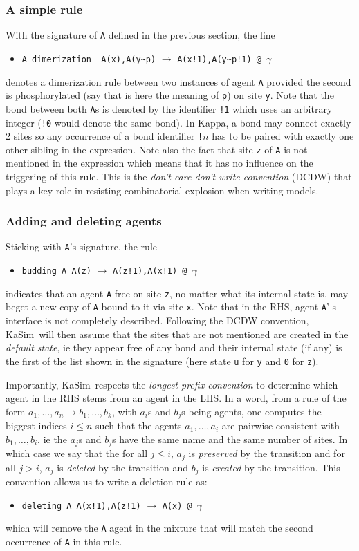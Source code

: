 \documentclass[11pt]{book}
\def\KaSim{\textsf{KaSim}}
\def\int{\hbox{\texttt{\~}}}
\def\ttt#1{\texttt{#1}}
\def\var#1{\textquotesingle #1\textquotesingle}
\def\rar{\rightarrow}
\def\ga{\gamma}
\def\ie{ie }
\def\via{via }
\def\ITE#1{\begin{itemize}#1\end{itemize}}
\begin{document}
\subsubsection*{A simple rule}
With the signature of \ttt{A} defined in the previous section, the line
\ITE{
\item[] \ttt{\textquotesingle A dimerization\textquotesingle~  A(x),A(y\int p)} $\rar$ \ttt{A(x!1),A(y\int p!1) @ $\ga$} 
}
denotes a dimerization rule between two instances of agent \ttt{A} provided the second is phosphorylated (say that is here the meaning of \ttt{p}) on site \ttt{y}. Note that the bond between both \ttt{A}s is denoted by the identifier \ttt{!1} which uses an arbitrary integer (\ttt{!0} would denote the same bond). In Kappa, a bond may connect exactly 2 sites so any occurrence of a bond identifier \ttt{!}$n$ has to be paired with exactly one other sibling in the expression. Note also the fact that site \ttt{z} of \ttt{A} is not mentioned in the expression which means that it has no influence on the triggering of this rule. This is the \emph{don't care don't write convention} (DCDW)  that plays a key role in resisting combinatorial explosion when writing models.

\subsubsection*{Adding and deleting agents}
Sticking with \ttt{A}'s signature, the rule
\ITE{
\item[] \ttt{\var{budding A}~A(z)} $\rar$ \ttt{A(z!1),A(x!1) @ $\ga$ } 
}
indicates that an agent \ttt{A} free on site \ttt{z}, no matter what its internal state is, may beget a new copy of \ttt{A} bound to it \via site \ttt{x}. Note that in the RHS, agent \ttt{A}' s interface is not completely described. Following the DCDW convention, \KaSim~will then assume that the sites that are not mentioned are created in the \emph{default state}, \ie they appear free of any bond and their internal state (if any) is the first of the list shown in the signature (here state \ttt{u} for \ttt{y} and \ttt{0} for \ttt{z}).

Importantly, \KaSim~respects the \emph{longest prefix convention} to determine which agent in the RHS stems from an agent in the LHS. 
In a word, from a rule of the form $a_1,\dots,a_n\rar b_1,\dots,b_k$, with $a_i$s and $b_j$s being agents, one computes the biggest indices $i\leq n$ such that the agents $a_1,\dots,a_i$ are pairwise consistent with $b_1,\dots,b_i$, \ie the $a_j$s and $b_j$s have the same name and the same number of sites. In which case we say that the for all $j\leq i$, $a_j$ is \emph{preserved} by the transition and for all $j>i$, $a_j$ is \emph{deleted} by the transition and $b_j$ is \emph{created} by the transition. This convention allows us to write a deletion rule as:
\ITE{
\item[] \ttt{\textquotesingle deleting A\textquotesingle\  A(x!1),A(z!1)} $\rar$ \ttt{A(x) @ $\ga$} 
}
which will remove the \ttt{A} agent in the mixture that will match the second occurrence of \ttt{A} in this rule.
\end{document}
